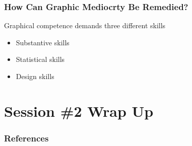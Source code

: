 \documentclass[notes, aspectratio=1610]{beamer}
\begin{document}
\begin{frame}
	\frametitle{How Can Graphic Mediocrty Be Remedied?}
	Graphical competence demands three different skills

	\begin{itemize}
		\item Substantive skills
		\item Statistical skills
		\item Design skills
	\end{itemize}
\end{frame}

\section{Session \#2 Wrap Up}


\begin{frame}
	\frametitle{References}
	\printbibliography
 \end{frame} 
\end{document}

